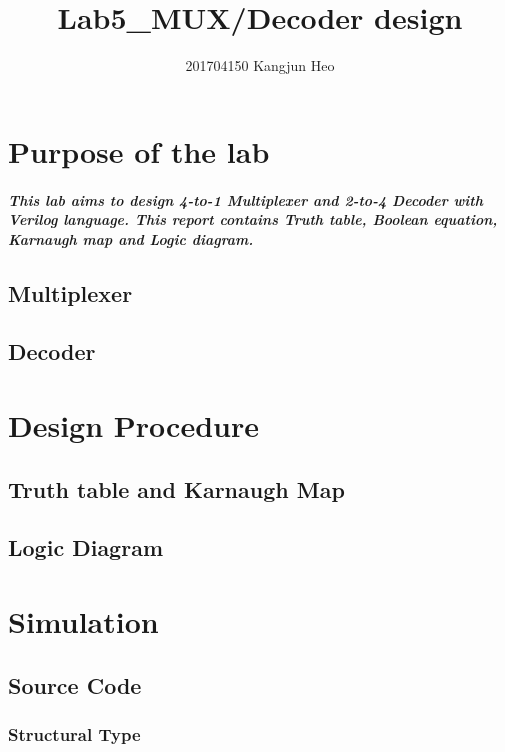 \documentclass{report}
\title{Lab5\_MUX/Decoder design}
\author{201704150 Kangjun Heo}
\begin{document}
    \maketitle
    \tableofcontents

    \chapter{Purpose of the lab}

        \paragraph{This lab aims to design 4-to-1 Multiplexer and 2-to-4 Decoder with Verilog language. This report contains Truth table, Boolean equation, Karnaugh map and Logic diagram.}
    
        \section{Multiplexer}

        \section{Decoder}

    \chapter{Design Procedure}

        \section{Truth table and Karnaugh Map}

        \section{Logic Diagram}

    \chapter{Simulation}
        \section{Source Code}
            \subsection{Structural Type}
\end{document}
